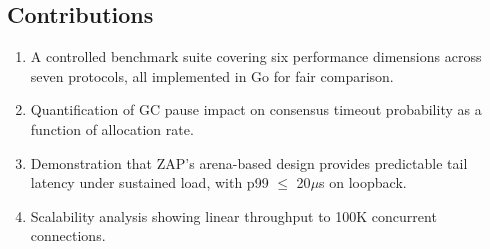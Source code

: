 \subsection{Contributions}

\begin{enumerate}
\item A controlled benchmark suite covering six performance dimensions across seven protocols, all implemented in Go for fair comparison.
\item Quantification of GC pause impact on consensus timeout probability as a function of allocation rate.
\item Demonstration that ZAP's arena-based design provides predictable tail latency under sustained load, with p99 $\leq$ 20$\mu$s on loopback.
\item Scalability analysis showing linear throughput to 100K concurrent connections.
\end{enumerate}

